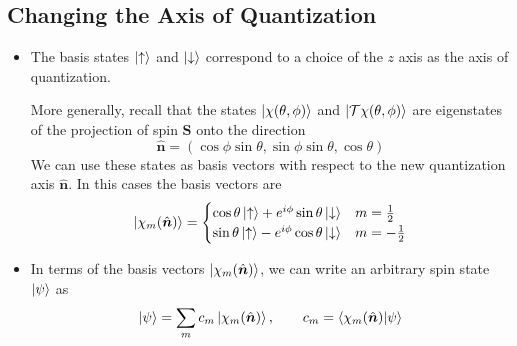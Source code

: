 \documentclass[11pt, a4paper]{article}
\renewcommand{\vec}[1]{\bm{#1}}  %
\newcommand{\uvec}[1]{\hat{\vec{#1}}}  %
\newcommand{\ua}{\uparrow}  %
\newcommand{\da}{\downarrow}  %
\newcommand{\T}{\mathcal{T}}  %
\newcommand{\p}{\psi}  %
\begin{document}
\subsection{Changing the Axis of Quantization}
\begin{itemize}
	\item The basis states $ \ket{\ua} $ and $ \ket{\da} $ correspond to a choice of the $ z $ axis as the axis of quantization. 
	
	More generally, recall that the states $ \ket{\chi(\theta, \phi)}  $ and $ \ket{\T \chi(\theta, \phi)}  $ are eigenstates of the projection of spin $ \vec{S} $ onto the direction
	\begin{equation*}
		\uvec{n} = (\cos \phi \sin \theta, \sin \phi \sin \theta, \cos \theta)
	\end{equation*}
	We can use these states as basis vectors with respect to the new quantization axis $ \uvec{n} $. In this cases the basis vectors are
	\begin{equation*}
		\ket{\chi_{m}(\uvec{n})} = 
		\begin{cases}
			\cos \theta \ket{\ua} + e^{i\phi} \sin \theta \ket{\da} & m = \frac{1}{2}\\
			\sin \theta \ket{\ua} - e^{i\phi} \cos \theta \ket{\da} & m = -\frac{1}{2}
		\end{cases}
	\end{equation*}
	
	\item In terms of the basis vectors $ \ket{\chi_{m}(\uvec{n})} $, we can write an arbitrary spin state $ \ket{\p} $ as
	\begin{equation*}
		\ket{\p} = \sum_{m} c_{m}\ket{\chi_{m}(\uvec{n})}, \qquad c_{m} =  \braket{\chi_{m}(\uvec{n})}{\p}
	\end{equation*}
	
\end{itemize}
\end{document}
